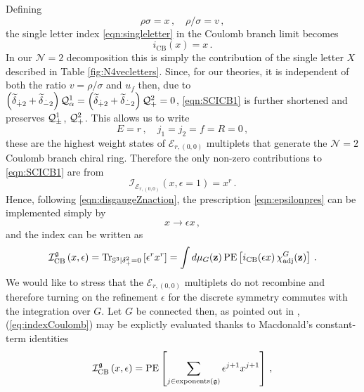 \documentclass[main.tex]{subfiles}
\begin{document}
Defining
\begin{equation}
\rho\sigma=x\,,\quad \rho/\sigma=v \, ,
\end{equation}
the single letter index \eqref{eqn:singleletter} in the Coulomb branch limit becomes
\begin{equation}
i_{\text{CB}}(x)=x\,.
\end{equation}
In our $\mathcal{N}=2$ decomposition this is simply the contribution of the single letter $X$ described in Table \ref{fig:N4vecletters}. 
Since, for our theories, it is independent of both the ratio $v=\rho/\sigma$ and $u_f$ then, due to $\left(\widetilde{\delta}_{\dot+2}+\widetilde{\delta}_{\dot-2}\right)\mathcal{Q}_{\alpha}^1=\left(\widetilde{\delta}_{\dot+2}+\widetilde{\delta}_{\dot-2}\right)\mathcal{Q}^2_{+}=0$, \eqref{eqn:SCICB1} is further shortened and preserves $\mathcal{Q}^1_{\pm}$, $\mathcal{Q}^2_{+}$. This allows us to write 
\begin{equation}
E=r\,,\quad j_1=j_2=f=R=0\,,
\end{equation}
these are the highest weight states of $\mathcal{E}_{r,(0,0)}$ multiplets that generate the $\mathcal{N}=2$ Coulomb branch chiral ring. Therefore the only non-zero contributions to \eqref{eqn:SCICB1} are from 
\begin{equation}
\mathcal{I}_{\mathcal{E}_{r,(0,0)}}(x,\epsilon=1)=x^r\,.
\end{equation} 
Hence, following \eqref{eqn:disgaugeZnaction}, the prescription \eqref{eqn:epsilonpres} can be implemented simply by
\begin{equation}
x\to\epsilon x \, ,
\end{equation}
and the index can be written as
\begin{equation}
\label{eq:indexCoulomb}
\mathcal{I}^{\mathfrak{g}}_{\text{CB}}\left(x,\epsilon\right)= \textrm{Tr}_{\mathbb{S}^3|\delta_+^2=0}\left[\epsilon^rx^{r}\right]= \int d\mu_{G}(\mathbf{z}) \operatorname{\mathrm{PE}}\left[ i_{\text{CB}}(\epsilon x)\,\chi_{\text{adj}}^{G}(\mathbf{z})\right] \,.
\end{equation}
We would like to stress that the $\mathcal{E}_{r,(0,0)}$ multiplets do not recombine \cite{DolanOsborn} and therefore turning on the refinement $\epsilon$ for the discrete symmetry commutes with the integration over $G$. 
Let $G$ be connected then, as pointed out in \cite{Gadde:2011uv},  (\ref{eq:indexCoulomb}) may be explictly evaluated thanks to Macdonald's constant-term identities \cite{macdonald1998symmetric,macdonald}
\begin{equation}\label{eqn:SCICBdeg}
\mathcal{I}^{\mathfrak{g}}_{\text{CB}}\left(x,\epsilon\right)= \operatorname{\mathrm{PE}}\left[\sum_{j\in \operatorname{exponents}(\mathfrak{g})}\epsilon^{j+1}x^{j+1}\right]\,,
\end{equation}
\end{document}
